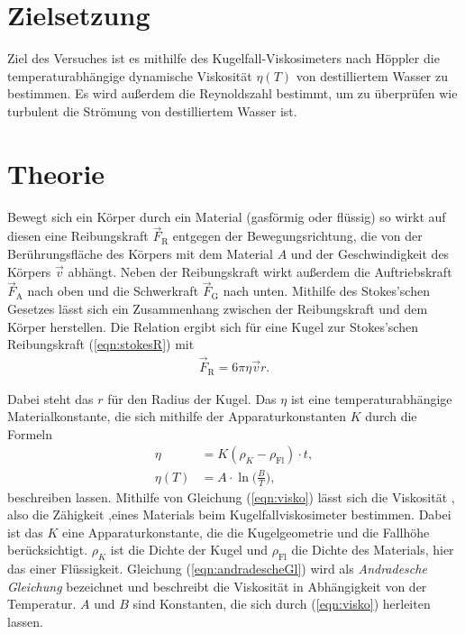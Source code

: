 \section{Zielsetzung}
\label{sec:Ziel}
Ziel des Versuches ist es mithilfe des Kugelfall-Viskosimeters nach Höppler die temperaturabhängige dynamische Viskosität $\eta(T)$ 
von destilliertem Wasser zu bestimmen. Es wird außerdem die Reynoldszahl bestimmt, um zu überprüfen wie turbulent die Strömung von
destilliertem Wasser ist.

\section{Theorie}
\label{sec:Theorie}

Bewegt sich ein Körper durch ein Material (gasförmig oder flüssig) so wirkt auf diesen eine Reibungskraft $\vec F_{\text{R}}$ entgegen der
Bewegungsrichtung, die von der Berührungsfläche des Körpers mit dem Material $A$ und der Geschwindigkeit des Körpers $\vec v$ abhängt.
Neben der Reibungskraft wirkt außerdem die Auftriebskraft $\vec F_{\text{A}}$ nach oben und die Schwerkraft $\vec F_{\text{G}}$ nach unten.
\newline Mithilfe des Stokes'schen Gesetzes lässt sich ein Zusammenhang zwischen der Reibungskraft und dem Körper herstellen. Die Relation ergibt
sich für eine Kugel zur Stokes'schen Reibungskraft (\ref{eqn:stokesR}) mit
\begin{align}
    \vec F_{\text{R}} = 6\pi\eta\vec v r.
    \label{eqn:stokesR}
\end{align}

Dabei steht das $r$ für den Radius der Kugel. Das $\eta$ ist eine temperaturabhängige Materialkonstante, die sich mithilfe der
Apparaturkonstanten $K$ durch die Formeln
\begin{align}
    \label{eqn:visko}
    \eta &= K (\rho_{K} - \rho_{\text{Fl}}) \cdot t, \\
    \label{eqn:andradescheGl}
    \eta(T) &= A\cdot\ln\Big(\frac{B}{T} \Big),
\end{align}
beschreiben lassen. \newline
Mithilfe von Gleichung (\ref{eqn:visko}) lässt sich die Viskosität , also die Zähigkeit ,eines Materials beim Kugelfallviskosimeter
bestimmen. Dabei ist das $K$ eine Apparaturkonstante, die die Kugelgeometrie und die Fallhöhe berücksichtigt.
$\rho_{K}$  ist die Dichte der Kugel und $\rho_{\text{Fl}}$ die Dichte des Materials, hier das einer Flüssigkeit. \newline
Gleichung (\ref{eqn:andradescheGl}) wird als \textit{Andradesche Gleichung} bezeichnet und beschreibt die Viskosität in Abhängigkeit 
von der Temperatur. $A$ und $B$ sind Konstanten, die sich durch (\ref{eqn:visko}) herleiten lassen.

